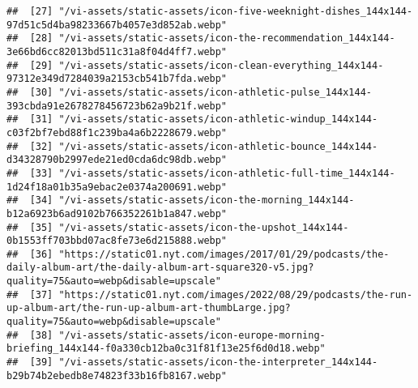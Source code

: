 \documentclass[
]{article}
\begin{document}
\begin{verbatim}
##  [27] "/vi-assets/static-assets/icon-five-weeknight-dishes_144x144-97d51c5d4ba98233667b4057e3d852ab.webp"                                                                                                   
##  [28] "/vi-assets/static-assets/icon-the-recommendation_144x144-3e66bd6cc82013bd511c31a8f04d4ff7.webp"                                                                                                      
##  [29] "/vi-assets/static-assets/icon-clean-everything_144x144-97312e349d7284039a2153cb541b7fda.webp"                                                                                                        
##  [30] "/vi-assets/static-assets/icon-athletic-pulse_144x144-393cbda91e2678278456723b62a9b21f.webp"                                                                                                          
##  [31] "/vi-assets/static-assets/icon-athletic-windup_144x144-c03f2bf7ebd88f1c239ba4a6b2228679.webp"                                                                                                         
##  [32] "/vi-assets/static-assets/icon-athletic-bounce_144x144-d34328790b2997ede21ed0cda6dc98db.webp"                                                                                                         
##  [33] "/vi-assets/static-assets/icon-athletic-full-time_144x144-1d24f18a01b35a9ebac2e0374a200691.webp"                                                                                                      
##  [34] "/vi-assets/static-assets/icon-the-morning_144x144-b12a6923b6ad9102b766352261b1a847.webp"                                                                                                             
##  [35] "/vi-assets/static-assets/icon-the-upshot_144x144-0b1553ff703bbd07ac8fe73e6d215888.webp"                                                                                                              
##  [36] "https://static01.nyt.com/images/2017/01/29/podcasts/the-daily-album-art/the-daily-album-art-square320-v5.jpg?quality=75&auto=webp&disable=upscale"                                                   
##  [37] "https://static01.nyt.com/images/2022/08/29/podcasts/the-run-up-album-art/the-run-up-album-art-thumbLarge.jpg?quality=75&auto=webp&disable=upscale"                                                   
##  [38] "/vi-assets/static-assets/icon-europe-morning-briefing_144x144-f0a330cb12ba0c31f81f13e25f6d0d18.webp"                                                                                                 
##  [39] "/vi-assets/static-assets/icon-the-interpreter_144x144-b29b74b2ebedb8e74823f33b16fb8167.webp"                                                                                                         

\end{verbatim}
\end{document}
